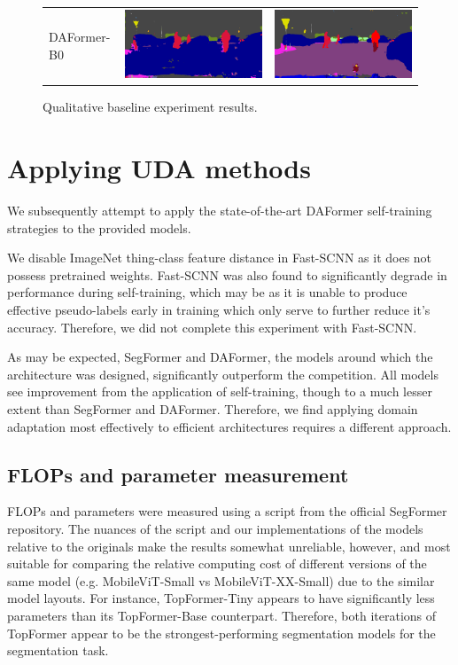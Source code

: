 \documentclass[a4paper,12pt]{report}
\begin{document}
\begin{figure}[]
\begin{tabular}{lll}
        DAFormer-B0        & \includegraphics[width=.2\linewidth,valign=m]{res/lightweight-uda-baseline-qualitative/daformer-mitb0-sourceonly.png}     & \includegraphics[width=.2\linewidth,valign=m]{res/lightweight-uda-baseline-qualitative/daformer-mitb0-selftraining.png}     \\
    \end{tabular}
    \caption{Qualitative baseline experiment results.}
    \label{fig: lightweight-model-baseline}
\end{figure}

\section{Applying UDA methods}
We subsequently attempt to apply the state-of-the-art DAFormer self-training strategies to the provided models.

We disable ImageNet thing-class feature distance in Fast-SCNN as it does not possess pretrained weights. Fast-SCNN was also found to significantly degrade in performance during self-training, which may be as it is unable to produce effective pseudo-labels early in training which only serve to further reduce it's accuracy. Therefore, we did not complete this experiment with Fast-SCNN.

As may be expected, SegFormer and DAFormer, the models around which the architecture was designed, significantly outperform the competition. All models see improvement from the application of self-training, though to a much lesser extent than SegFormer and DAFormer. Therefore, we find applying domain adaptation most effectively to efficient architectures requires a different approach.

\subsection{FLOPs and parameter measurement}

FLOPs and parameters were measured using a script from the official SegFormer repository. The nuances of the script and our implementations of the models relative to the originals make the results somewhat unreliable, however, and most suitable for comparing the relative computing cost of different versions of the same model (e.g. MobileViT-Small vs MobileViT-XX-Small) due to the similar model layouts. For instance, TopFormer-Tiny appears to have significantly less parameters than its TopFormer-Base counterpart. Therefore, both iterations of TopFormer appear to be the strongest-performing segmentation models for the segmentation task.
\end{document}
